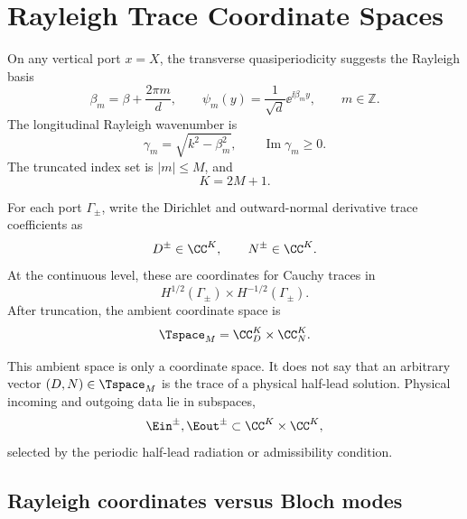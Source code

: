 %
%
%
%
%

\section{Rayleigh Trace Coordinate Spaces}

On any vertical port \(x=X\), the transverse quasiperiodicity suggests the
Rayleigh basis
\[
  \beta_m=\beta+\frac{2\pi m}{d},
  \qquad
  \psi_m(y)=\frac{1}{\sqrt d}\ee^{\ii\beta_m y},
  \qquad
  m\in\mathbb Z .
\]
The longitudinal Rayleigh wavenumber is
\[
  \gamma_m=\sqrt{k^2-\beta_m^2},
  \qquad
  \operatorname{Im}\gamma_m\ge 0 .
\]
The truncated index set is \(|m|\le M\), and
\[
  K=2M+1 .
\]

For each port \(\Gamma_\pm\), write the Dirichlet and outward-normal derivative
trace coefficients as
\[
  D^\pm\in\CC^K,
  \qquad
  N^\pm\in\CC^K .
\]
At the continuous level, these are coordinates for Cauchy traces in
\[
  H^{1/2}(\Gamma_\pm)\times H^{-1/2}(\Gamma_\pm).
\]
After truncation, the ambient coordinate space is
\[
  \Tspace_M=\CC_D^K\times\CC_N^K .
\]

This ambient space is only a coordinate space.  It does not say that an
arbitrary vector \((D,N)\in\Tspace_M\) is the trace of a physical half-lead
solution.  Physical incoming and outgoing data lie in subspaces,
\[
  \Ein^\pm,\Eout^\pm
  \subset
  \CC^K\times\CC^K,
\]
selected by the periodic half-lead radiation or admissibility condition.

\subsection{Rayleigh coordinates versus Bloch modes}

